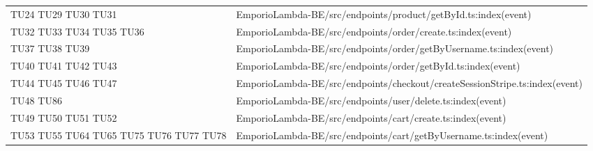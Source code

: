 {\begin{longtable}{C{2cm} C{12.8cm}}
TU24 \newline TU29 \newline TU30 \newline TU31 & EmporioLambda-BE/src/endpoints/product/getById.ts:index(event)\\

TU32 \newline TU33 \newline TU34 \newline TU35 \newline TU36 & EmporioLambda-BE/src/endpoints/order/create.ts:index(event)\\

TU37 \newline TU38 \newline TU39 & EmporioLambda-BE/src/endpoints/order/getByUsername.ts:index(event)\\

TU40 \newline TU41 \newline TU42 \newline TU43 & EmporioLambda-BE/src/endpoints/order/getById.ts:index(event)\\

TU44 \newline TU45 \newline TU46 \newline TU47 & EmporioLambda-BE/src/endpoints/checkout/createSessionStripe.ts:index(event)\\

TU48 \newline TU86 & EmporioLambda-BE/src/endpoints/user/delete.ts:index(event)\\

TU49 \newline TU50 \newline TU51 \newline TU52 & EmporioLambda-BE/src/endpoints/cart/create.ts:index(event)\\

TU53 \newline TU55 \newline TU64 \newline TU65 \newline TU75 \newline TU76 \newline TU77 \newline TU78 & EmporioLambda-BE/src/endpoints/cart/getByUsername.ts:index(event)\\


\end{longtable}}
